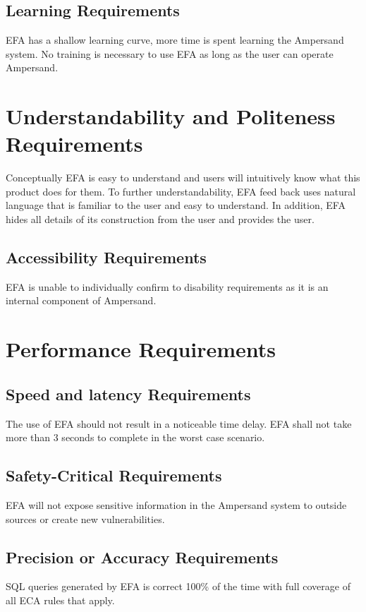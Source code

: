 \documentclass[12pt]{report}
\begin{document}
\subsection{Learning Requirements}\label{subsec:LearningReq}
EFA has a shallow learning curve, more time is spent learning the Ampersand 
system. No training is necessary to use EFA as long as the user can operate 
Ampersand.

\section{Understandability and Politeness 
Requirements}\label{sec:Understandability}
Conceptually EFA is easy to understand and users will intuitively know what 
this product does for them. To further understandability, EFA feed back uses 
natural language that is familiar to the user and easy to understand. In 
addition, EFA hides all details of its construction from the user and provides 
the user. 

\subsection{Accessibility Requirements}\label{Accessibility}
EFA is unable to individually confirm to disability requirements as it is an 
internal component of Ampersand.

\section{Performance Requirements}\label{sec:Performance}
\subsection{Speed and latency Requirements}\label{subsec:SpeedReq}
The use of EFA should not result in a noticeable time delay. EFA shall 
not take more than 3 seconds to complete in the worst case scenario.

\subsection{Safety-Critical Requirements}\label{subec:SafetyReq}
EFA will not expose sensitive information in the Ampersand system to outside 
sources or create new vulnerabilities.

\subsection{Precision or Accuracy Requirements}\label{subsec:AccuracyReq}
SQL queries generated by EFA is correct 100\% of the time with full coverage of 
all ECA rules that apply.
 
\end{document}
